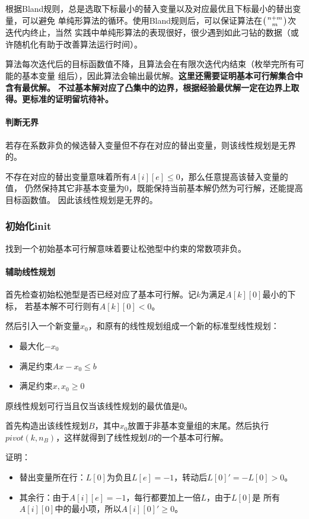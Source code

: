 根据Bland规则，总是选取下标最小的替入变量以及对应最优且下标最小的替出变量，可以避免
单纯形算法的循环。使用Bland规则后，可以保证算法在$\left(n+m \atop m\right)$次迭代内终止，当然
实践中单纯形算法的表现很好，很少遇到如此刁钻的数据（或许随机化有助于改善算法运行时间）。

算法每次迭代后的目标函数值不降，且算法会在有限次迭代内结束（枚举完所有可能的基本变量
组后），因此算法会输出最优解。{\bfseries 这里还需要证明基本可行解集合中含有最优解。
不过基本解对应了凸集中的边界，根据经验最优解一定在边界上取得。更标准的证明留坑待补。}
\paragraph{判断无界}
若存在系数非负的候选替入变量但不存在对应的替出变量，则该线性规划是无界的。

不存在对应的替出变量意味着所有$A[i][e]\leq 0$，那么任意提高该替入变量的值，
仍然保持其它非基本变量为0，既能保持当前基本解仍然为可行解，还能提高目标函数值。
因此该线性规划是无界的。
\subsubsection{初始化init}
找到一个初始基本可行解意味着要让松弛型中约束的常数项非负。
\paragraph{辅助线性规划}
首先检查初始松弛型是否已经对应了基本可行解。记$k$为满足$A[k][0]$最小的下标，
若基本解不可行则有$A[k][0]<0$。

然后引入一个新变量$x_0$，和原有的线性规划组成一个新的标准型线性规划：
\begin{itemize}
    \item 最大化$-x_0$
    \item 满足约束$Ax-x_0\leq b$
    \item 满足约束$x,x_0\geq 0$
\end{itemize}
原线性规划可行当且仅当该线性规划的最优值是0。

首先构造出该线性规划$B$，其中$x_0$放置于非基本变量组的末尾。然后执行\\
$pivot(k,n_B)$，这样就得到了线性规划$B$的一个基本可行解。

证明：
\begin{itemize}
    \item 替出变量所在行：$L[0]$为负且$L[e]=-1$，转动后$L[0]'=-L[0]>0$。
    \item 其余行：由于$A[i][e]=-1$，每行都要加上一倍$L$，由于$L[0]$是
    所有$A[i][0]$中的最小项，所以$A[i][0]'\geq 0$。
\end{itemize}

